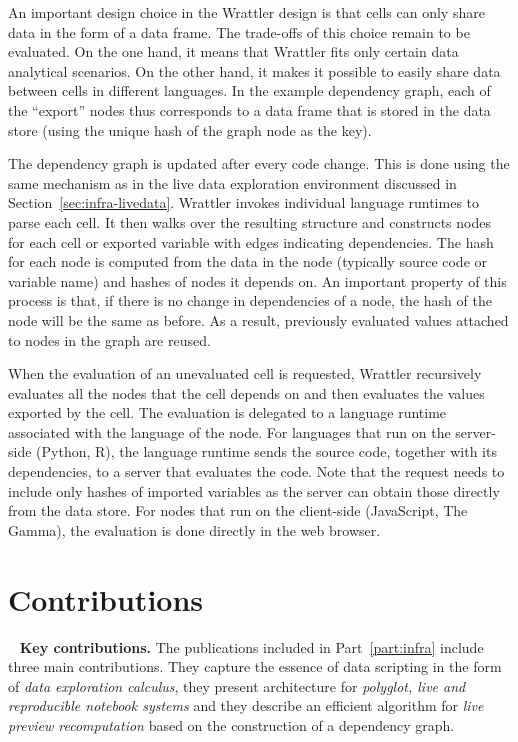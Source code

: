 \documentclass[fleqn,11pt]{report}
\theoremstyle{definition}
\DeclareRobustCommand{\keyideabox}[3]{\begin{tcolorbox}[breakable,
  boxsep=10pt,left=0pt,right=0pt,top=0pt,bottom=0pt,width=\dimexpr\textwidth\relax,
  colback=gray!20,colframe=gray!20,
  enlarge bottom by=5pt,enlarge top by=5pt,
  arc=0pt,outer arc=0pt]
\lettrine[lraise=0.3]{\LARGE #1}{~}
\textbf{#2.} #3
\end{tcolorbox}
}
\begin{document}
An important design choice in the Wrattler design is that cells can only share data in the form
of a data frame. The trade-offs of this choice remain to be evaluated. On the one hand,
it means that Wrattler fits only certain data analytical scenarios. On the other hand, it
makes it possible to easily share data between cells in different languages. In the
example dependency graph, each of the ``export'' nodes thus corresponds to a data frame that
is stored in the data store (using the unique hash of the graph node as the key).

The dependency graph is updated after every code change. This is done using the same
mechanism as in the live data exploration environment discussed in Section~\ref{sec:infra-livedata}.
Wrattler invokes individual language runtimes to parse each cell. It then walks over the
resulting structure and constructs nodes for each cell or exported variable with edges
indicating dependencies. The hash for each node is computed from the data in the node (typically
source code or variable name) and hashes of nodes it depends on. An important property of this
process is that, if there is no change in dependencies of a node, the hash of the node
will be the same as before. As a result, previously evaluated values attached to nodes
in the graph are reused.

When the evaluation of an unevaluated cell is requested, Wrattler recursively evaluates all
the nodes that the cell depends on and then evaluates the values exported by the cell.
The evaluation is delegated to a language runtime associated with the language of the node.
For languages that run on the server-side (Python, R), the language runtime sends the source
code, together with its dependencies, to a server that evaluates the code. Note that the
request needs to include only hashes of imported variables as the server can obtain those
directly from the data store. For nodes that run on the client-side (JavaScript, The Gamma),
the evaluation is done directly in the web browser.

\section{Contributions}

\keyideabox{\faPencilSquareO}{Key contributions}{The publications included in Part~\ref{part:infra}
include three main contributions. They capture the essence of data scripting in the form of
\emph{data exploration calculus}, they present architecture for \emph{polyglot, live and reproducible
notebook systems} and they describe an efficient algorithm for \emph{live preview recomputation}
based on the construction of a dependency graph.}
\end{document}
